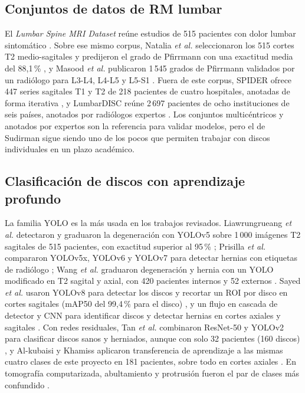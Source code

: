 \subsection{Conjuntos de datos de RM lumbar}
El \emph{Lumbar Spine MRI Dataset} reúne estudios de 515 pacientes con dolor lumbar sintomático \cite{sudirman2019}. Sobre ese mismo corpus, Natalia \emph{et al.} seleccionaron los 515 cortes T2 medio-sagitales y predijeron el grado de Pfirrmann con una exactitud media del 88,1\,\% \cite{natalia2024}, y Masood \emph{et al.} publicaron 1\,545 grados de Pfirrmann validados por un radiólogo para L3-L4, L4-L5 y L5-S1 \cite{masood2026}. Fuera de este corpus, SPIDER ofrece 447 series sagitales T1 y T2 de 218 pacientes de cuatro hospitales, anotadas de forma iterativa \cite{vandergraaf2024}, y LumbarDISC reúne 2\,697 pacientes de ocho instituciones de seis países, anotados por radiólogos expertos \cite{richards2026}. Los conjuntos multicéntricos y anotados por expertos son la referencia para validar modelos, pero el de Sudirman sigue siendo uno de los pocos que permiten trabajar con discos individuales en un plazo académico.

\subsection{Clasificación de discos con aprendizaje profundo}
La familia YOLO es la más usada en los trabajos revisados. Liawrungrueang \emph{et al.} detectaron y graduaron la degeneración con YOLOv5 sobre 1\,000 imágenes T2 sagitales de 515 pacientes, con exactitud superior al 95\,\% \cite{liawrungrueang2023}; Prisilla \emph{et al.} compararon YOLOv5x, YOLOv6 y YOLOv7 para detectar hernias con etiquetas de radiólogo \cite{prisilla2023}; Wang \emph{et al.} graduaron degeneración y hernia con un YOLO modificado en T2 sagital y axial, con 420 pacientes internos y 52 externos \cite{wang2025}. Sayed \emph{et al.} usaron YOLOv8 para detectar los discos y recortar un ROI por disco en cortes sagitales (mAP50 del 99,4\,\% para el disco) \cite{sayed2025scirep}, y un flujo en cascada de detector y CNN para identificar discos y detectar hernias en cortes axiales y sagitales \cite{sayed2025imu}. Con redes residuales, Tan \emph{et al.} combinaron ResNet-50 y YOLOv2 para clasificar discos sanos y herniados, aunque con solo 32 pacientes (160 discos) \cite{tan2024}, y Al-kubaisi y Khamiss aplicaron transferencia de aprendizaje a las mismas cuatro clases de este proyecto en 181 pacientes, sobre todo en cortes axiales \cite{alkubaisi2022}. En tomografía computarizada, abultamiento y protrusión fueron el par de clases más confundido \cite{gao2025}.

